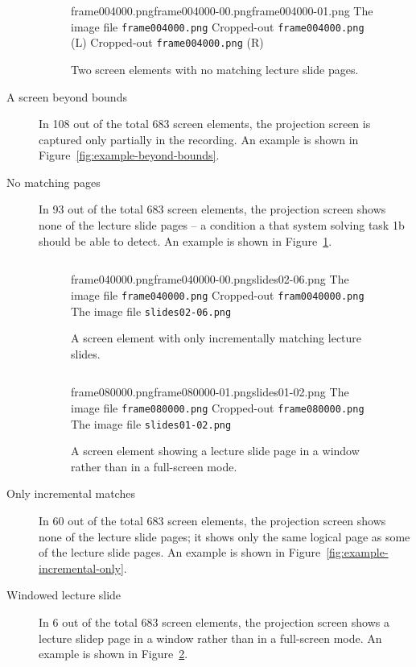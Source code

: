 \begin{description}
\begin{figure}
    \kern\floatsep
    \inputminted{xml}{fig/examples/no-keyrefs/example.xml}\par
      {frame004000.png}{frame004000-00.png}{frame004000-01.png}%
      {The image file \texttt{frame004000.png}}%
      {Cropped-out \texttt{frame004000.png} (L)}%
      {Cropped-out \texttt{frame004000.png} (R)}
    \caption{Two screen elements with no matching lecture slide pages.}
    \label{fig:example-no-keyrefs}
  \end{figure}
  \item[A screen beyond bounds] In 108 out of the total 683 screen elements,
    the projection screen is captured only partially in the recording. An
    example is shown in Figure~\ref{fig:example-beyond-bounds}.
  \item[No matching pages] In 93 out of the total 683 screen elements, the
    projection screen shows none of the lecture slide pages – a condition a
    that system solving task 1b should be able to detect. An example is shown
    in Figure~\ref{fig:example-no-keyrefs}.

  \begin{figure}
    \inputminted{xml}{fig/examples/incremental-only/example.xml}\par
      {frame040000.png}{frame040000-00.png}{slides02-06.png}%
      {The image file \texttt{frame040000.png}}%
      {Cropped-out \texttt{fram0040000.png}}%
      {The image file \texttt{slides02-06.png}}
    \caption{A screen element with only incrementally matching lecture slides.}
    \label{fig:example-incremental-only}

    \kern\floatsep
    \inputminted{xml}{fig/examples/windowed/example.xml}\par
      {frame080000.png}{frame080000-01.png}{slides01-02.png}%
      {The image file \texttt{frame080000.png}}%
      {Cropped-out \texttt{frame080000.png}}%
      {The image file \texttt{slides01-02.png}}
    \caption{A screen element showing a lecture slide page in a window rather
      than in a full-screen mode.}
    \label{fig:example-windowed}
  \end{figure}
  \item[Only incremental matches] In 60 out of the total 683 screen elements,
    the projection screen shows none of the lecture slide pages; it shows only
    the same logical page as some of the lecture slide pages. An example is
    shown in Figure~\ref{fig:example-incremental-only}.
  \item[Windowed lecture slide] In 6 out of the total 683 screen elements,
    the projection screen shows a lecture slidep page in a window rather than
    in a full-screen mode. An example is shown in
    Figure~\ref{fig:example-windowed}.


\end{description}

